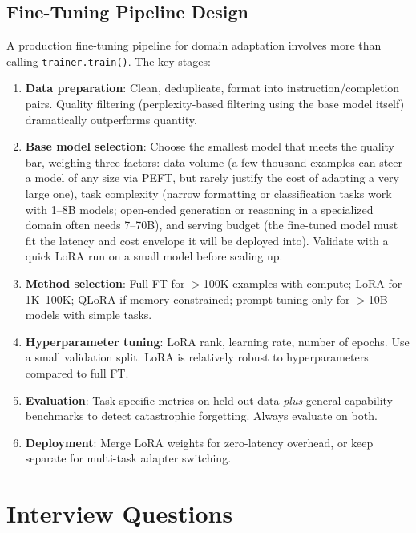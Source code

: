 \subsection{Fine-Tuning Pipeline Design}

A production fine-tuning pipeline for domain adaptation involves more than calling \texttt{trainer.train()}. The key stages:

\begin{enumerate}
    \item \textbf{Data preparation}: Clean, deduplicate, format into instruction/completion pairs. Quality filtering (perplexity-based filtering using the base model itself) dramatically outperforms quantity.
    \item \textbf{Base model selection}: Choose the smallest model that meets the quality bar, weighing three factors: data volume (a few thousand examples can steer a model of any size via PEFT, but rarely justify the cost of adapting a very large one), task complexity (narrow formatting or classification tasks work with 1--8B models; open-ended generation or reasoning in a specialized domain often needs 7--70B), and serving budget (the fine-tuned model must fit the latency and cost envelope it will be deployed into). Validate with a quick LoRA run on a small model before scaling up.
    \item \textbf{Method selection}: Full FT for $>$100K examples with compute; LoRA for 1K--100K; QLoRA if memory-constrained; prompt tuning only for $>$10B models with simple tasks.
    \item \textbf{Hyperparameter tuning}: LoRA rank, learning rate, number of epochs. Use a small validation split. LoRA is relatively robust to hyperparameters compared to full FT.
    \item \textbf{Evaluation}: Task-specific metrics on held-out data \textit{plus} general capability benchmarks to detect catastrophic forgetting. Always evaluate on both.
    \item \textbf{Deployment}: Merge LoRA weights for zero-latency overhead, or keep separate for multi-task adapter switching.
\end{enumerate}

\section{Interview Questions}
\label{sec:transfer_interview}

